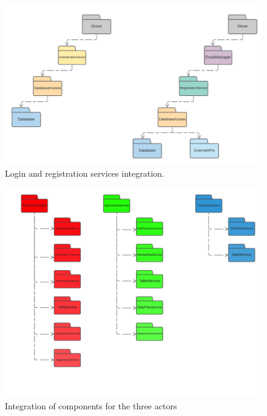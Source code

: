 \begin{center}
    \begin{figure}[h!]
  \includegraphics[width=\textwidth,height=\textheight,keepaspectratio]{./Images/IntegrationStrategy/IT2.png}
  \caption{Login and registration services integration.}
\end{figure}
\end{center}


\begin{center}
    \begin{figure}[h!]
  \includegraphics[width=\textwidth,height=\textheight,keepaspectratio]{./Images/IntegrationStrategy/IT3-mod.png}
  \caption{Integration of components for the three actors}
\end{figure}
\end{center}



